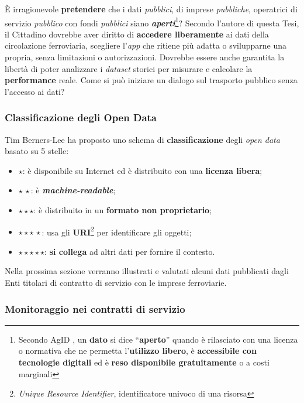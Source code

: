 \documentclass[12pt,italian]{report}
\begin{document}
È irragionevole \textbf{pretendere} che i dati \textit{pubblici}, di
imprese \textit{pubbliche}, operatrici di servizio \textit{pubblico}
con fondi \textit{pubblici} siano
\textbf{\textit{aperti}}\footnote{Secondo AgID \cite{AgidOpenData}, un
    \textbf{dato} si dice ``\textbf{aperto}'' quando è rilasciato con
    una licenza o normativa che ne permetta l'\textbf{utilizzo
        libero}, è \textbf{accessibile con tecnologie digitali} ed è
    \textbf{reso disponibile gratuitamente} o a costi marginali}?
Secondo l'autore di questa Tesi, il Cittadino dovrebbe aver diritto di
\textbf{accedere liberamente} ai dati della circolazione ferroviaria,
scegliere l'\textit{app} che ritiene più adatta o svilupparne una
propria, senza limitazioni o autorizzazioni.  Dovrebbe essere anche
garantita la libertà di poter analizzare i \textit{dataset} storici
per misurare e calcolare la \textbf{performance} reale.  Come si può
iniziare un dialogo sul trasporto pubblico senza l'accesso ai dati?

\subsubsection{Classificazione degli Open Data}

Tim Berners-Lee ha proposto \cite{W3LinkedData} uno schema di
\textbf{classificazione} degli \textit{open data} basato su 5 stelle:
\begin{itemize}
    \item $\star$: è disponibile su Internet ed è distribuito con una
    \textbf{licenza libera};
    \item $\star\,\star$: è \textbf{\textit{machine-readable}};
    \item $\star \star \star$: è distribuito in un \textbf{formato non
        proprietario};
    \item $\star \star \star\,\star$: usa gli
    \textbf{URI}\footnote{\textit{Unique Resource Identifier},
        identificatore univoco di una risorsa} per identificare gli
    oggetti;
    \item $\star \star \star \star \star$: \textbf{si collega} ad
    altri dati per fornire il contesto.
\end{itemize}

Nella prossima sezione verranno illustrati e valutati alcuni dati
pubblicati dagli Enti titolari di contratto di servizio con le imprese
ferroviarie.

\subsubsection{Monitoraggio nei contratti di servizio}
\end{document}
